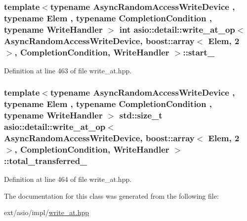 \subsubsection[{start\+\_\+}]{\setlength{\rightskip}{0pt plus 5cm}template$<$typename Async\+Random\+Access\+Write\+Device , typename Elem , typename Completion\+Condition , typename Write\+Handler $>$ int {\bf asio\+::detail\+::write\+\_\+at\+\_\+op}$<$ Async\+Random\+Access\+Write\+Device, {\bf boost\+::array}$<$ Elem, 2 $>$,                           Completion\+Condition, Write\+Handler $>$\+::start\+\_\+}\label{classasio_1_1detail_1_1write__at__op_3_01_async_random_access_write_device_00_01boost_1_1array_3e439bc739a816bec12c3cd7d54fe10a0_a2b9bce629998958a019197c59245f0af}


Definition at line 463 of file write\+\_\+at.\+hpp.

\hypertarget{classasio_1_1detail_1_1write__at__op_3_01_async_random_access_write_device_00_01boost_1_1array_3e439bc739a816bec12c3cd7d54fe10a0_a08cf6ce28355116cba46d99adc04e51f}{}
\subsubsection[{total\+\_\+transferred\+\_\+}]{\setlength{\rightskip}{0pt plus 5cm}template$<$typename Async\+Random\+Access\+Write\+Device , typename Elem , typename Completion\+Condition , typename Write\+Handler $>$ std\+::size\+\_\+t {\bf asio\+::detail\+::write\+\_\+at\+\_\+op}$<$ Async\+Random\+Access\+Write\+Device, {\bf boost\+::array}$<$ Elem, 2 $>$,                           Completion\+Condition, Write\+Handler $>$\+::total\+\_\+transferred\+\_\+}\label{classasio_1_1detail_1_1write__at__op_3_01_async_random_access_write_device_00_01boost_1_1array_3e439bc739a816bec12c3cd7d54fe10a0_a08cf6ce28355116cba46d99adc04e51f}


Definition at line 464 of file write\+\_\+at.\+hpp.



The documentation for this class was generated from the following file\+:\begin{DoxyCompactItemize}
\item 
ext/asio/impl/\hyperlink{impl_2write__at_8hpp}{write\+\_\+at.\+hpp}\end{DoxyCompactItemize}
